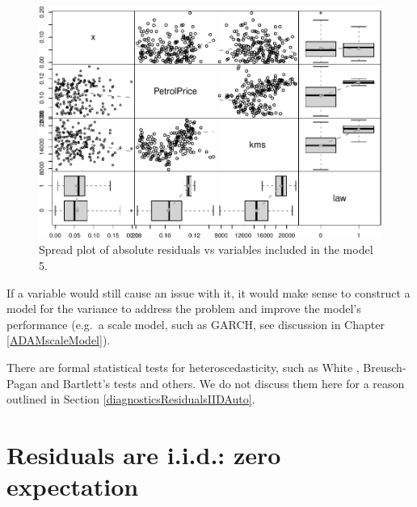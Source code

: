 \documentclass[
]{book}
\theoremstyle{definition}
\theoremstyle{definition}
\theoremstyle{definition}
\theoremstyle{definition}
\theoremstyle{remark}
\begin{document}
\begin{figure}
\centering
\includegraphics{Svetunkov--2022----ADAM_files/figure-latex/adamSeat05Spread-1.pdf}
\caption{\label{fig:adamSeat05Spread}Spread plot of absolute residuals vs variables included in the model 5.}
\end{figure}

If a variable would still cause an issue with it, it would make sense to construct a model for the variance to address the problem and improve the model's performance (e.g.~a scale model, such as GARCH, see discussion in Chapter \ref{ADAMscaleModel}).

There are formal statistical tests for heteroscedasticity, such as White \citep{WikipediaWhite2021}, Breusch-Pagan \citep{WikipediaBreuschPagan2021} and Bartlett's \citep{WikipediaBartlett2021} tests and others. We do not discuss them here for a reason outlined in Section \ref{diagnosticsResidualsIIDAuto}.

\hypertarget{diagnosticsResidualsIIDExpectation}{%
\section{Residuals are i.i.d.: zero expectation}\label{diagnosticsResidualsIIDExpectation}}
\end{document}
